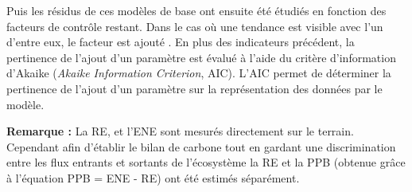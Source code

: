 Puis les résidus de ces modèles de base ont ensuite été étudiés en fonction des facteurs de contrôle restant.
Dans le cas où une tendance est visible avec l'un d'entre eux, le facteur est ajouté \plop.
En plus des indicateurs précédent, la pertinence de l'ajout d'un paramètre est évalué à l'aide du  critère d'information d'Akaike (\textit{Akaike Information Criterion}, AIC).
L'AIC permet de déterminer la pertinence de l'ajout d'un paramètre sur la représentation des données par le modèle.

\begin{center}
\begin{minipage}{.85\textwidth}
\setlength{\parindent}{-10pt}%
\onehalfspacing
\textbf{Remarque :} La RE, et l'ENE sont mesurés directement sur le terrain.
Cependant afin d'établir le bilan de carbone tout en gardant une discrimination entre les flux entrants et sortants de l'écosystème la RE et la PPB (obtenue grâce à l'équation PPB = ENE - RE) ont été estimés séparément.
\end{minipage}
\end{center}
 


